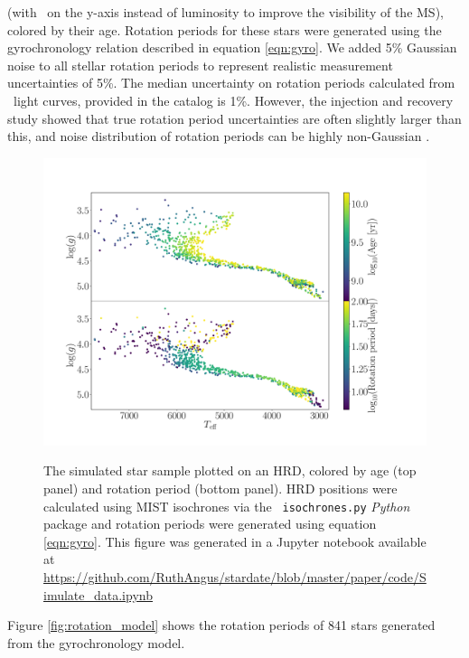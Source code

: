 (with \logg\ on the y-axis instead of luminosity to improve the visibility of
the MS), colored by their age.
Rotation periods for these stars were generated using the gyrochronology
relation described in equation \ref{eqn:gyro}.
We added 5\% Gaussian noise to all stellar rotation periods to represent
realistic measurement uncertainties of 5\%.
The median uncertainty on rotation periods calculated from \kepler\ light
curves, provided in the \citet{mcquillan2014} catalog is 1\%.
However, the \citet{aigrain2015} injection and recovery study showed that true
rotation period uncertainties are often slightly larger than this, and noise
distribution of rotation periods can be highly non-Gaussian
\citep[\eg][]{aigrain2015, angus2018}.
\begin{figure}
  \caption{
      The simulated star sample plotted on an HRD, colored by age
    (top panel) and rotation period (bottom panel).
    HRD positions were calculated using MIST isochrones via the {\tt
    isochrones.py} {\it Python} package and rotation periods were generated
    using equation \ref{eqn:gyro}.
    This figure was generated in a Jupyter notebook available at
    \url{https://github.com/RuthAngus/stardate/blob/master/paper/code/Simulate_data.ipynb}
}
  \centering
    \includegraphics[width=1\textwidth]{simulated_CMD}
\label{fig:CMD_age}
\end{figure}
Figure \ref{fig:rotation_model} shows the rotation periods of 841
stars generated from the gyrochronology model.
